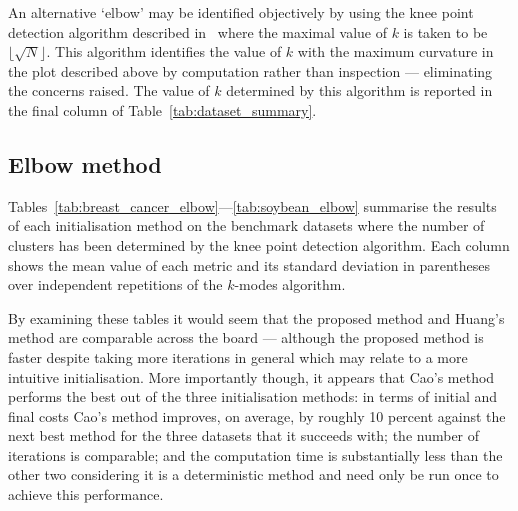 An alternative `elbow' may be identified objectively by using the knee point
detection algorithm described in~\cite{Satopaa2011} where the maximal value of
\(k\) is taken to be \(\lfloor\sqrt{N}\rfloor\). This algorithm identifies the
value of \(k\) with the maximum curvature in the plot described above by
computation rather than inspection --- eliminating the concerns raised. The
value of \(k\) determined by this algorithm is reported in the final column of
Table~\ref{tab:dataset_summary}.

\subsection{Elbow method}\label{subsec:elbow}
\graphicspath{{./img/elbow/}}

Tables~\ref{tab:breast_cancer_elbow}---\ref{tab:soybean_elbow}
summarise the results of each initialisation method on the benchmark datasets
where the number of clusters has been determined by the knee point detection
algorithm. Each column shows the mean value of each metric and its standard
deviation in parentheses over independent
repetitions of the \(k\)-modes algorithm.

\begin{table}[htbp]
    \centering
    \resizebox{\tablewidth}{!}{%
        
    }
    \label{tab:breast_cancer_elbow}\vspace{20pt}

    \resizebox{\tablewidth}{!}{%
        
    }
    \label{tab:mushroom_elbow}\vspace{20pt}

    \resizebox{\tablewidth}{!}{%
        
    }
    \label{tab:nursery_elbow}\vspace{20pt}

    \resizebox{\tablewidth}{!}{%
        
    }
    \label{tab:soybean_elbow}
\end{table}

By examining these tables it would seem that the proposed method and Huang's
method are comparable across the board --- although the proposed method is
faster despite taking more iterations in general which may relate to a more
intuitive initialisation. More importantly though, it appears that Cao's method
performs the best out of the three initialisation methods: in terms of initial
and final costs Cao's method improves, on average, by roughly 10 percent against
the next best method for the three datasets that it succeeds with; the number of
iterations is comparable; and the computation time is substantially less than
the other two considering it is a deterministic method and need only be run once
to achieve this performance.

